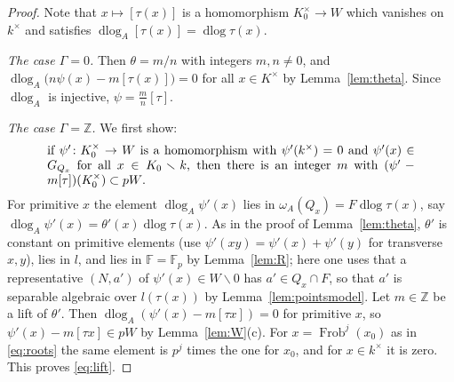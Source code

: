 \documentclass[11pt]{amsart}
\theoremstyle{definition}
\theoremstyle{remark}
\newcommand{\ZZ}{\mathbb{Z}}
\newcommand{\FF}{\mathbb{F}}
\newcommand{\Frob}{\operatorname{Frob}}
\newcommand{\dlog}{\operatorname{dlog}}
\newcommand{\sm}{\smallsetminus}
\begin{document}
\begin{proof}
Note that $x\mapsto[\tau(x)]$ is a homomorphism $K_0^\times\to W$ which vanishes on $k^\times$ and satisfies $\dlog_A[\tau(x)]=\dlog\tau(x)$.

\emph{The case $\Gamma=0$.} Then $\theta=m/n$ with integers $m,n\ne0$, and $\dlog_A\bigl(n\psi(x)-m[\tau(x)]\bigr)=0$ for all $x\in K^\times$ by Lemma~\ref{lem:theta}. Since $\dlog_A$ is injective, $\psi=\frac mn[\tau]$.

\emph{The case $\Gamma=\ZZ$.} We first show:
\begin{equation}\label{eq:lift}
\begin{minipage}{0.86\textwidth}
if $\psi'\colon K_0^\times\to W$ is a homomorphism with $\psi'(k^\times)=0$ and $\psi'(x)\in G_{Q_x}$ for all $x\in K_0\sm k$, then there is an integer $m$ with $(\psi'-m[\tau])(K_0^\times)\subset pW$.
\end{minipage}
\end{equation}
For primitive $x$ the element $\dlog_A\psi'(x)$ lies in $\omega_A(Q_x)=F\dlog\tau(x)$, say $\dlog_A\psi'(x)=\theta'(x)\dlog\tau(x)$. As in the proof of Lemma~\ref{lem:theta}, $\theta'$ is constant on primitive elements (use $\psi'(xy)=\psi'(x)+\psi'(y)$ for transverse $x,y$),
lies in $l$, and lies in $\FF=\FF_p$ by Lemma~\ref{lem:R}; here one uses that a representative $(N,a')$ of $\psi'(x)\in W\sm0$ has $a'\in Q_x\cap F$, so that $a'$ is separable algebraic over $l(\tau(x))$ by Lemma~\ref{lem:pointsmodel}. Let $m\in\ZZ$ be a lift of $\theta'$. Then $\dlog_A(\psi'(x)-m[\tau x])=0$ for primitive $x$, so $\psi'(x)-m[\tau x]\in pW$ by Lemma~\ref{lem:W}(c).
For $x=\Frob^j(x_0)$ as in \eqref{eq:roots} the same element is $p^j$ times the one for $x_0$, and for $x\in k^\times$ it is zero. This proves \eqref{eq:lift}.


\end{proof}
\end{document}

